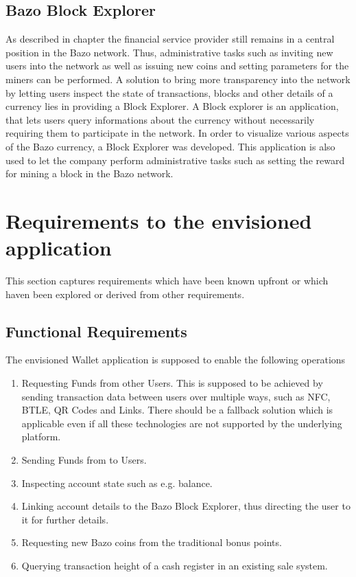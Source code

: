 \subsection{Bazo Block Explorer\label{bazoblockexplorer}}
As described in chapter \cite{undefined} the financial service provider still remains in a central position in the Bazo network. Thus, administrative tasks such as inviting new users into the network as well as issuing new coins and setting
parameters for the miners can be performed.
A solution to bring more transparency into the network by letting users inspect the state of transactions, blocks and other details of a currency lies in providing a Block Explorer. A Block explorer is an application, that lets users query informations about the currency without necessarily requiring them to participate in the network.
In order to visualize various aspects of the Bazo currency, a Block Explorer was developed. This application is also used to let the company perform administrative tasks such as setting the reward for mining a block in the Bazo network.
\section{Requirements to the envisioned application}
This section captures requirements which have been known upfront or which haven been explored or derived from other requirements. 
\subsection{Functional Requirements}\label{functionalreq}
The envisioned Wallet application is supposed to enable the following operations
\begin{enumerate}
\item Requesting Funds from other Users.
This is supposed to be achieved by sending transaction data between users over multiple ways, such as NFC, BTLE, QR Codes and Links. There should be a fallback solution which is applicable even if all these technologies are not supported by the underlying platform.
\item Sending Funds from to Users.
\item Inspecting account state such as e.g. balance.
\item Linking account details to the Bazo Block Explorer, thus directing the user to it for further details.
\item Requesting new Bazo coins from the traditional bonus points.
\item Querying transaction height of a cash register in an existing sale system.


\end{enumerate}
